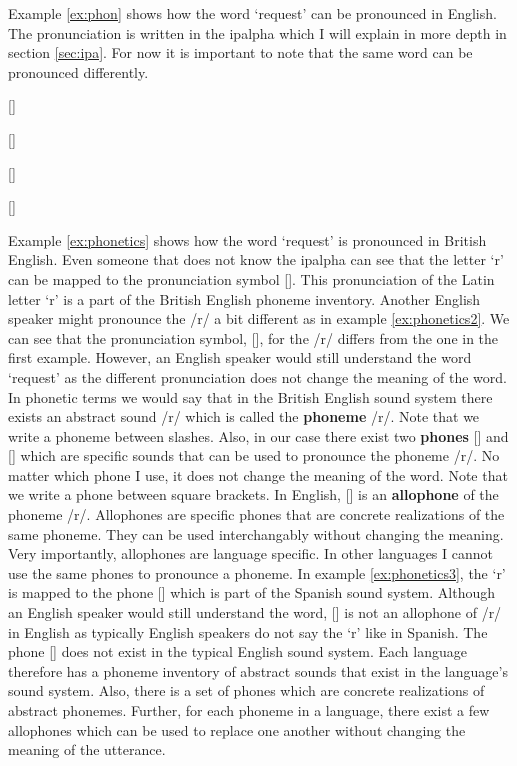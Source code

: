Example \ref{ex:phon} shows how the word `request' can be pronounced in English. The pronunciation is written in the \ac{ipalpha} which I will explain in more depth in section \ref{sec:ipa}. For now it is important to note that the same word can be pronounced differently.

\begin{covsubexamples}[preamble={Different pronunciations of the English word `request'. Note that example (d) is a incorrect pronunciation:}] \label{ex:phon}
\item \label{ex:phonetics} [] %
\item \label{ex:phonetics2} [] %
\item \label{ex:phonetics3} [] %
\item \label{ex:phonetics4} [] %
\end{covsubexamples}

Example \ref{ex:phonetics} shows how the word `request' is pronounced in British English. Even someone that does not know the \ac{ipalpha} can see that the letter `r' can be mapped to the pronunciation symbol []. This pronunciation of the Latin letter `r' is a part of the British English phoneme inventory. Another English speaker might pronounce the /r/ a bit different as in example \ref{ex:phonetics2}. We can see that the pronunciation symbol, [], for the /r/ differs from the one in the first example. However, an English speaker would still understand the word `request' as the different pronunciation does not change the meaning of the word. In phonetic terms we would say that in the British English sound system there exists an abstract sound /r/ which is called the \textbf{phoneme} /r/. Note that we write a phoneme between slashes. Also, in our case there exist two \textbf{phones} [] and [] which are specific sounds that can be used to pronounce the phoneme /r/. No matter which phone I use, it does not change the meaning of the word. Note that we write a phone between square brackets. In English, [] is an \textbf{allophone} of the phoneme /r/. Allophones are specific phones that are concrete realizations of the same phoneme. They can be used interchangably without changing the meaning. Very importantly, allophones are language specific. In other languages I cannot use the same phones to pronounce a phoneme. In example \ref{ex:phonetics3}, the `r' is mapped to the phone [] which is part of the Spanish sound system. Although an English speaker would still understand the word, [] is not an allophone of /r/ in English as typically English speakers do not say the `r' like in Spanish. The phone [] does not exist in the typical English sound system. Each language therefore has a phoneme inventory of abstract sounds that exist in the language's sound system. Also, there is a set of phones which are concrete realizations of abstract phonemes. Further, for each phoneme in a language, there exist a few allophones which can be used to replace one another without changing the meaning of the utterance.    

